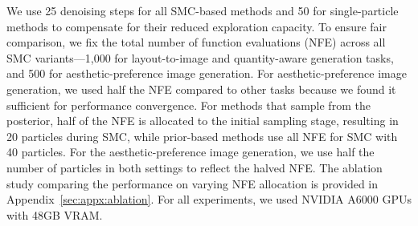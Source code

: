 We use 25 denoising steps for all SMC-based methods and 50 for single-particle methods to compensate for their reduced exploration capacity. To ensure fair comparison, we fix the total number of function evaluations (NFE) across all SMC variants—1,000 for layout-to-image and quantity-aware generation tasks, and 500 for aesthetic-preference image generation. For aesthetic-preference image generation, we used half the NFE compared to other tasks because we found it sufficient for performance convergence.
For methods that sample from the posterior, half of the NFE is allocated to the initial sampling stage, resulting in 20 particles during SMC, while prior-based methods use all NFE for SMC with 40 particles. 
For the aesthetic-preference image generation, we use half the number of particles in both settings to reflect the halved NFE.
The ablation study comparing the performance on varying NFE allocation is provided in Appendix~\ref{sec:appx:ablation}.
For all experiments, we used NVIDIA A6000 GPUs with 48GB VRAM.
